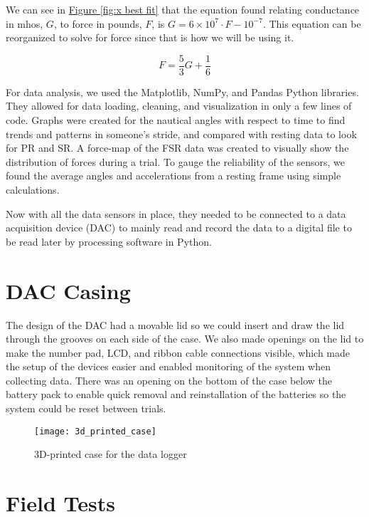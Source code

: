 We can see in \hyperref[{fig:x best fit}]{Figure \ref*{fig:x best fit}} that the equation found relating conductance in mhos, $G$, to force in pounds, $F$, is $G = 6\times10^7\cdot F - 10^{-7}$.
This equation can be reorganized to solve for force since that is how we will be using it.\par

\begin{equation}
  F=\frac{5}{3}G+\frac{1}{6}\label{eq:x F}
\end{equation}

For data analysis, we used the Matplotlib, NumPy, and Pandas Python libraries.
They allowed for data loading, cleaning, and visualization in only a few lines of code.
Graphs were created for the nautical angles with respect to time to find trends and patterns in someone’s stride, and compared with resting data to look for PR and SR.
A force-map of the FSR data was created to visually show the distribution of forces during a trial.
To gauge the reliability of the sensors, we found the average angles and accelerations from a resting frame using simple calculations.\par

Now with all the data sensors in place, they needed to be connected to a data acquisition device (DAC) to mainly read and record the data to a digital file to be read later by processing software in Python.\par

\section{DAC Casing}
The design of the DAC had a movable lid so we could insert and draw the lid through the grooves on each side of the case.
We also made openings on the lid to make the number pad, LCD, and ribbon cable connections visible, which made the setup of the devices easier and enabled monitoring of the system when collecting data.
There was an opening on the bottom of the case below the battery pack to enable quick removal and reinstallation of the batteries so the system could be reset between trials.\par

\begin{figure}[h]
  \centering
  \texttt{[image: 3d\_printed\_case]}
  \caption[DAC case]{3D-printed case for the data logger}
  \label{fig:x case}
\end{figure}


\section{Field Tests}


